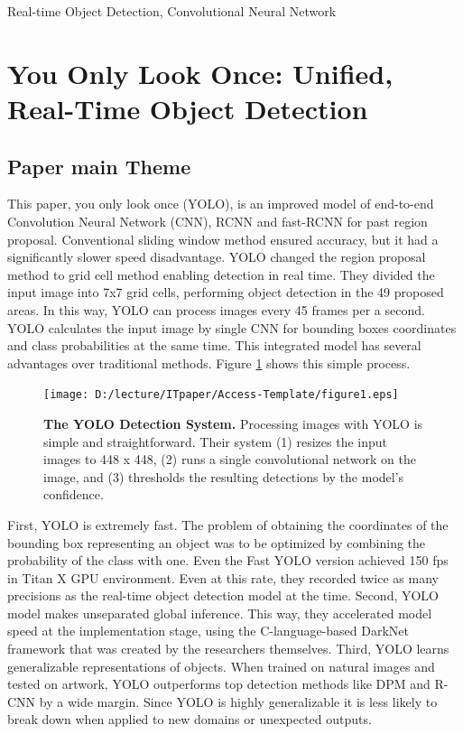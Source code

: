 \documentclass{ieeeaccess}
\begin{document}
\begin{keywords}
Real-time Object Detection, Convolutional Neural Network
\end{keywords}

\titlepgskip=-15pt

\maketitle

\section{You Only Look Once: Unified, Real-Time Object Detection}
\label{sec:You Only Look Once: Unified, Real-Time Object Detection}
\subsection{Paper main Theme}
This paper, you only look once (YOLO), is an improved model of end-to-end Convolution Neural Network (CNN), RCNN and fast-RCNN for past region proposal. Conventional sliding window method ensured accuracy, but it had a significantly slower speed disadvantage. YOLO changed the region proposal method to grid cell method enabling detection in real time. They divided the input image into 7x7 grid cells, performing object detection in the 49 proposed areas. In this way, YOLO can process images every 45 frames per a second. YOLO calculates the input image by single CNN for bounding boxes coordinates and class probabilities at the same time. This integrated model has several advantages over traditional methods. Figure \ref{fig:figure1} shows this simple process.

\begin{figure}
	\centering
		\texttt{[image: D:/lecture/ITpaper/Access-Template/figure1.eps]}
	\caption{\textbf{The YOLO Detection System.} Processing images with YOLO is simple and straightforward. Their system (1) resizes the input images to 448 x 448, (2) runs a single convolutional network on the image, and (3) thresholds the resulting detections by the model's confidence.}
	\label{fig:figure1}
\end{figure}

First, YOLO is extremely fast. The problem of obtaining the coordinates of the bounding box representing an object was to be optimized by combining the probability of the class with one. Even the Fast YOLO version achieved 150 fps in Titan X GPU environment. Even at this rate, they recorded twice as many precisions as the real-time object detection model at the time.
Second, YOLO model makes unseparated global inference. This way, they accelerated model speed at the implementation stage, using the C-language-based DarkNet framework that was created by the researchers themselves.
Third, YOLO learns generalizable representations of objects. When trained on natural images and tested on artwork, YOLO outperforms top detection methods like DPM and R-CNN by a wide margin. Since YOLO is highly generalizable it is less likely to break down when applied to new domains or unexpected outputs.
\end{document}
